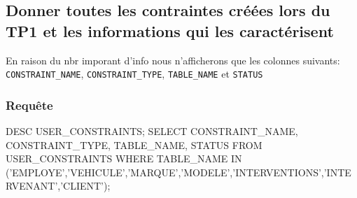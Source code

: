 \documentclass[•]{article}
\begin{document}
\subsection{Donner toutes les contraintes créées lors du TP1 et les informations qui les caractérisent}
En raison du nbr imporant d'info nous n'afficherons que les colonnes suivants: \texttt{CONSTRAINT\_NAME}, \texttt{CONSTRAINT\_TYPE}, \texttt{TABLE\_NAME} et \texttt{STATUS}
\subsubsection{Requête}
\begin{sql}
DESC USER_CONSTRAINTS;
SELECT  CONSTRAINT_NAME, CONSTRAINT_TYPE, TABLE_NAME, STATUS  FROM USER_CONSTRAINTS WHERE TABLE_NAME IN ('EMPLOYE','VEHICULE','MARQUE','MODELE','INTERVENTIONS','INTERVENANT','CLIENT');
\end{sql}
\end{document}
